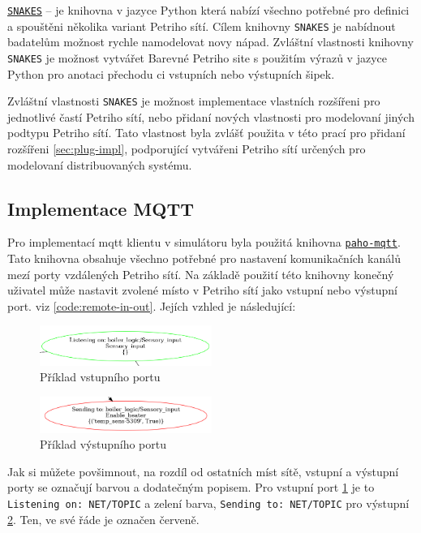 \href{https://www.ibisc.univ-evry.fr/~fpommereau/SNAKES/}{\texttt{SNAKES}} -- je knihovna v jazyce Python která nabízí všechno potřebné pro definici a spouštěni několika variant Petriho sítí. Cílem knihovny \texttt{SNAKES} je nabídnout badatelům možnost rychle namodelovat novy nápad. Zvláštní vlastnosti knihovny \texttt{SNAKES} je možnost vytvářet Barevné Petriho site s použitím výrazů v jazyce Python pro anotaci přechodu ci vstupních nebo výstupních šipek. \cite{snakes}

Zvláštní vlastnosti \texttt{SNAKES} je možnost implementace vlastních rozšířeni pro jednotlivé častí Petriho sítí, nebo přidaní nových vlastnosti pro modelovaní jiných podtypu Petriho sítí. Tato vlastnost byla zvlášť použita v této prací pro přidaní rozšířeni \ref{sec:plug-impl}, podporující vytvářeni Petriho sítí určených pro modelovaní distribuovaných systému.

\subsection{Implementace MQTT}
\label{subsec:mqtt_impl}
Pro implementací mqtt klientu v simulátoru byla použitá knihovna \href{https://pypi.org/project/paho-mqtt/}{\texttt{paho-mqtt}}. Tato knihovna obsahuje všechno potřebné pro nastavení komunikačních kanálů mezí porty vzdálených Petriho sítí. Na základě použití této knihovny konečný uživatel může nastavit zvolené místo v Petriho sítí jako vstupní nebo výstupní port. viz \ref{code:remote-in-out}. Jejích vzhled je následující:
\begin{figure}[hbt]
  \centering
  \includegraphics[width=0.5\textwidth]{obrazky-figures/port-in.png}
  \caption{Příklad vstupního portu}
  \label{port-in}
\end{figure}

\begin{figure}[hbt]
  \centering
  \includegraphics[width=0.5\textwidth]{obrazky-figures/port-out.png}
  \caption{Příklad výstupního portu}
  \label{port-out}
\end{figure}

Jak si můžete povšimnout, na rozdíl od ostatních míst sítě, vstupní a výstupní porty se označují barvou a dodatečným popisem. Pro vstupní port \ref{port-in} je to \texttt{Listening on: NET/TOPIC} a zelení barva, \texttt{Sending to: NET/TOPIC} pro výstupní \ref{port-out}. Ten, ve své řáde je označen červeně.

